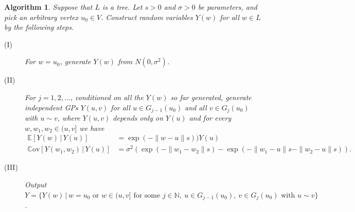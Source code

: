 \documentclass[alpha-refs]{wiley-article}
\newtheorem{alg}{Algorithm}
\begin{document}
\begin{alg}\label{a:2}
Suppose that $L$ is a tree. Let $s>0$ and $\sigma>0$ be parameters, and pick an arbitrary vertex $u_0\in V$. Construct random variables $Y(w)$ for all $w\in L$ by the following steps.
	\begin{description}
		\item[(I)] For $w=u_0$, generate $Y(w)$ from $N(0,\sigma^2)$.%
		\item[(II)] For $j=1,2,\ldots$, conditioned on all the $Y(w)$ so far generated,  generate independent GPs $Y(u,v)$ for all $u\in G_{j-1}(u_0)$ and all $v\in G_j(u_0)$ with $u\sim v$, where $Y(u,v)$ depends only on $Y(u)$ and for every $w,w_1,w_2\in(u,v]$ we have
		\begin{align}\label{e:M2}
		\mathbb E[Y(w)\,|\,Y(u)]&=\exp(-\|w-u\|s))Y(u)\\
		\label{e:M22}
		\mathbb C{\mathrm{ov}}[Y(w_1,w_2)\,|\,Y(u)]&=\sigma^2\left(\exp(-\|w_1-w_2\|s)-\exp(-\|w_1-u\|s-\|w_2-u\|s)\right).
		\end{align} 
		\item[(III)] Output $Y=\{Y(w)\,|\,w=u_0\mbox{ or }w\in (u,v]\mbox{ for some }j\in\mathbb N,\ u\in G_{j-1}(u_0),\ v\in G_j(u_0)\mbox{ with }u\sim v\}$.
	\end{description}
\end{alg}

\end{document}
